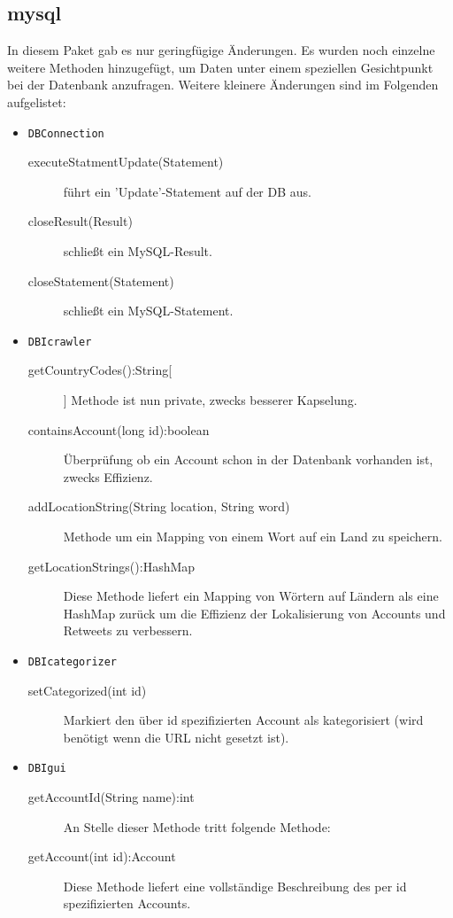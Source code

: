 \subsection{mysql}
In diesem Paket gab es nur geringfügige Änderungen. Es wurden noch einzelne weitere Methoden hinzugefügt, um Daten unter einem speziellen Gesichtpunkt bei der Datenbank anzufragen. Weitere kleinere Änderungen sind im Folgenden aufgelistet:
\begin{itemize}
	\item \lstinline{DBConnection}
	\begin{description}
		\item[executeStatmentUpdate(Statement)] führt ein 'Update'-Statement auf der DB aus.
		\item[closeResult(Result)] schließt ein MySQL-Result.
		\item[closeStatement(Statement)] schließt ein MySQL-Statement.
	\end{description}
			\item \lstinline{DBIcrawler}
	\begin{description}
		\item[getCountryCodes():String[]] Methode ist nun private, zwecks besserer Kapselung.
		\item[containsAccount(long id):boolean] Überprüfung ob ein Account schon in der Datenbank vorhanden ist, zwecks Effizienz.	
		\item[addLocationString(String location, String word)] Methode um ein Mapping von einem Wort auf ein Land zu speichern.
		\item[getLocationStrings():HashMap] Diese Methode liefert ein Mapping von Wörtern auf Ländern als eine HashMap zurück um die Effizienz der Lokalisierung von Accounts und Retweets zu verbessern.
	\end{description}
		\item \lstinline{DBIcategorizer}
	\begin{description}
		\item[setCategorized(int id)] Markiert den über id spezifizierten Account als kategorisiert (wird benötigt wenn die URL nicht gesetzt ist).
	\end{description}
			\item \lstinline{DBIgui}
	\begin{description}
		\item[getAccountId(String name):int] An Stelle dieser Methode tritt folgende Methode:
		\item[getAccount(int id):Account] Diese Methode liefert eine vollständige Beschreibung des per id spezifizierten Accounts.

\end{description}
\end{itemize}
